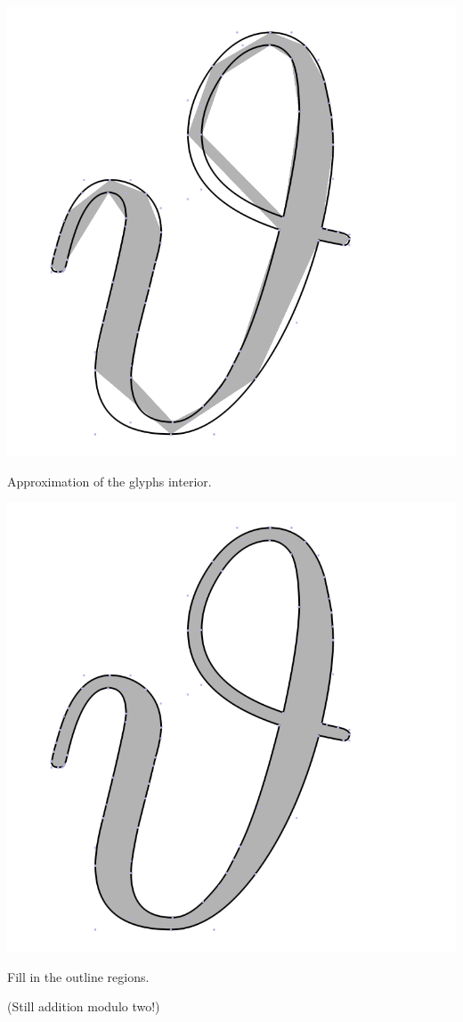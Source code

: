 \documentclass[14pt]{beamer}
\begin{document}
\begin{frame}
    \centering
    \includegraphics[height=0.625\textheight]{demo/step2.png}

    Approximation of the glyphs interior.

    \scriptsize{\quad}%
\end{frame}

\begin{frame}
    \centering 
    \includegraphics[height=0.625\textheight]{demo/step3.png}

    Fill in the outline regions.

    \scriptsize{(Still addition modulo two!)}
\end{frame}
\end{document}
